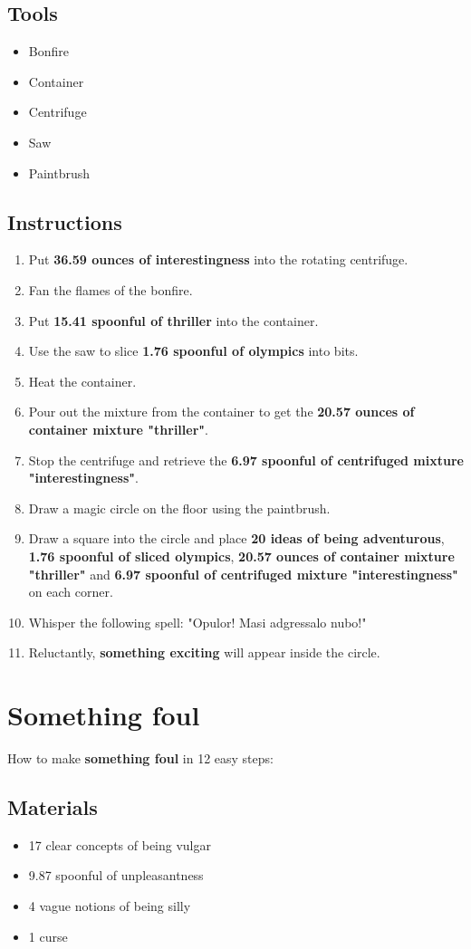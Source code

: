 \documentclass{article}
\begin{document}
\subsection{Tools}\begin{itemize}
\item 
Bonfire
\item 
Container
\item 
Centrifuge
\item 
Saw
\item 
Paintbrush
\end{itemize}
\subsection{Instructions}\begin{enumerate}
\item 
Put \textbf{36.59 ounces of interestingness} into the rotating centrifuge.
\item 
Fan the flames of the bonfire.
\item 
Put \textbf{15.41 spoonful of thriller} into the container.
\item 
Use the saw to slice \textbf{1.76 spoonful of olympics} into bits.
\item 
Heat the container.
\item 
Pour out the mixture from the container to get the \textbf{20.57 ounces of container mixture "thriller"}.
\item 
Stop the centrifuge and retrieve the \textbf{6.97 spoonful of centrifuged mixture "interestingness"}.
\item 
Draw a magic circle on the floor using the paintbrush.
\item 
Draw a square into the circle and place \textbf{20 ideas of being adventurous}, \textbf{1.76 spoonful of sliced olympics}, \textbf{20.57 ounces of container mixture "thriller"} and \textbf{6.97 spoonful of centrifuged mixture "interestingness"} on each corner.
\item 
Whisper the following spell: "Opulor! Masi adgressalo nubo!"
\item 
Reluctantly, \textbf{something exciting} will appear inside the circle.
\end{enumerate}
\newpage
\section{Something foul}How to make \textbf{something foul} in 12 easy steps:

\subsection{Materials}\begin{itemize}
\item 
17 clear concepts of being vulgar
\item 
9.87 spoonful of unpleasantness
\item 
4 vague notions of being silly
\item 
1 curse
\end{itemize}
\end{document}
